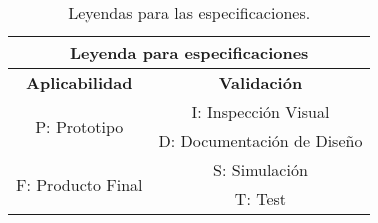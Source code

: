 \begin{table}[H]
\centering
\begin{tabular}{|c|c|}
\hline
\multicolumn{2}{|c|}{\textbf{Leyenda para especificaciones}}    \\ \hline
\textbf{Aplicabilidad}             & \textbf{Validación}        \\ \hline
\multirow{2}{*}{P: Prototipo}      & I: Inspección Visual       \\ \cline{2-2} 
                                   & D: Documentación de Diseño \\ \hline
\multirow{2}{*}{F: Producto Final} & S: Simulación              \\ \cline{2-2} 
                                   & T: Test                    \\ \hline
\end{tabular}
\caption{Leyendas para las especificaciones.}
\end{table}

